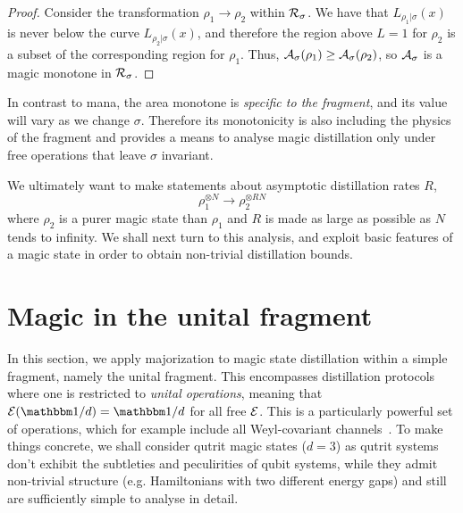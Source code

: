\documentclass[pra,
aps,
twocolumn,
superscriptaddress,
groupedaddress,
nofootinbib,
reprint
]{revtex4-1}
\begin{document}
\begin{proof}
Consider the transformation $\rho_1 \rightarrow \rho_2$ within $\mathcal{R}_\sigma$. We have that $L_{\rho_1|\sigma}(x)$ is never below the curve $L_{\rho_2|\sigma}(x)$, and therefore the region above $L=1$ for $\rho_2$ is a subset of the corresponding region for $\rho_1$. Thus, ${\mathcal A}_\sigma(\rho_1) \geq {\mathcal A}_\sigma(\rho_2)$, so ${\mathcal A}_\sigma$ is a magic monotone in $\mathcal{R}_\sigma$.
\end{proof}
In contrast to mana, the area monotone is \emph{specific to the fragment}, and its value will vary as we change $\sigma$. Therefore its monotonicity is also including the physics of the fragment and provides a means to analyse magic distillation only under free operations that leave $\sigma$ invariant.

We ultimately want to make statements about asymptotic distillation rates $R$,
\begin{equation}
\rho_1^{\otimes N} \longrightarrow \rho_2^{\otimes R N}
\end{equation}
where $\rho_2$ is a purer magic state than $\rho_1$ and $R$ is made as large as possible as $N$ tends to infinity. We shall next turn to this analysis, and exploit basic features of a magic state in order to obtain non-trivial distillation bounds.


\section{Magic in the unital fragment}

In this section, we apply majorization to magic state distillation within a simple fragment, namely the unital fragment. This encompasses distillation protocols where one is restricted to \emph{unital operations}, meaning that $\E(\I/d) = \I/d$ for all free $\mathcal{E}$. This is a particularly powerful set of operations, which for example include all Weyl-covariant channels~\cite{cit:gross3}. To make things concrete, we shall consider qutrit magic states ($d=3$) as qutrit systems don't exhibit the subtleties and peculirities of qubit systems, while they admit non-trivial structure (e.g. Hamiltonians with two different energy gaps) and still are sufficiently simple to analyse in detail.
\end{document}
